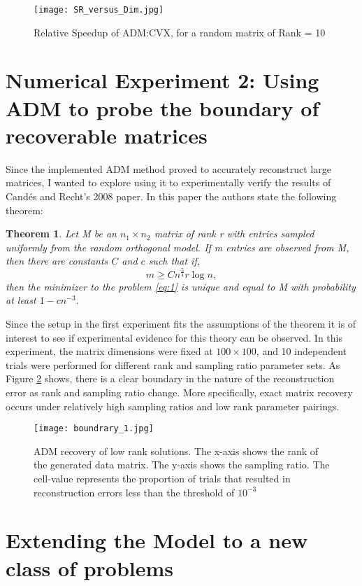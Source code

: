 \documentclass{article}
\newtheorem{theorem}{Theorem}
\begin{document}
\begin{figure}
\caption{Relative Speedup of ADM:CVX, for a random matrix of Rank = 10} \label{fig:speedup}
\centering
\texttt{[image: SR\_versus\_Dim.jpg]}
\end{figure}

\section{Numerical Experiment 2: Using ADM to probe the boundary of recoverable matrices}

Since the implemented ADM method proved to accurately reconstruct large matrices, I wanted to explore using it to experimentally verify the results of Cand\'es and Recht's 2008 paper.  In this paper the authors state the following theorem:
\begin{theorem}
Let M be an $n_1 \times n_2$ matrix of rank r with entries sampled uniformly from the random orthogonal model.  If m entries are observed from M, then there are constants $C$ and $c$ such that if,
$$
m \ge C n^{\frac 5 4}r \log n,
$$
then the minimizer to the problem \ref{eq:1} is unique and equal to M with probability at least $1 - cn ^ {-3}$. 
\end{theorem}
Since the setup in the first experiment fits the assumptions of the theorem it is of interest to see if experimental evidence for this theory can be observed.  In this experiment, the matrix dimensions were fixed at $100 \times 100$, and 10 independent trials were performed for different rank and sampling ratio parameter sets.  As Figure \ref{fig:bound} shows, there is a clear boundary in the nature of the reconstruction error as rank and sampling ratio change.  More specifically, exact matrix recovery occurs under relatively high sampling ratios and low rank parameter pairings.

\begin{figure}
\caption{ADM recovery of low rank solutions.  The x-axis shows the rank of the generated data matrix.  The y-axis shows the sampling ratio.  The cell-value represents the proportion of trials that resulted in reconstruction errors less than the threshold of $10^{-3}$} \label{fig:bound}
\centering
\texttt{[image: boundrary\_1.jpg]}
\end{figure}

\section{Extending the Model to a new class of problems}
\end{document}

